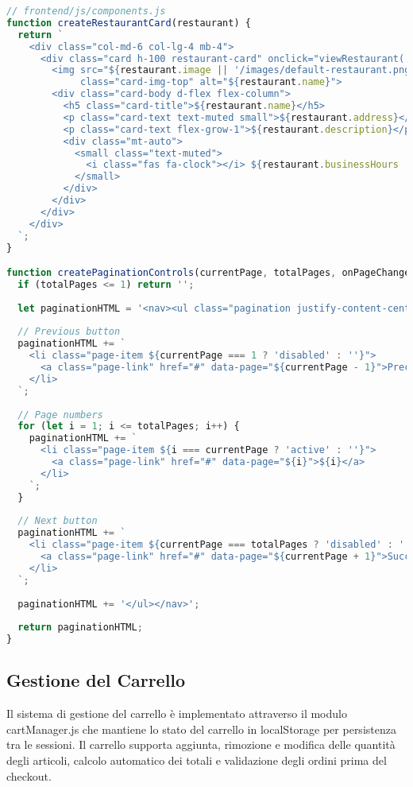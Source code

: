 \documentclass[12pt,a4paper]{article}
\begin{document}
\begin{lstlisting}[language=JavaScript, caption=Componenti UI riutilizzabili]
// frontend/js/components.js
function createRestaurantCard(restaurant) {
  return `
    <div class="col-md-6 col-lg-4 mb-4">
      <div class="card h-100 restaurant-card" onclick="viewRestaurant('${restaurant._id}')">
        <img src="${restaurant.image || '/images/default-restaurant.png'}" 
             class="card-img-top" alt="${restaurant.name}">
        <div class="card-body d-flex flex-column">
          <h5 class="card-title">${restaurant.name}</h5>
          <p class="card-text text-muted small">${restaurant.address}</p>
          <p class="card-text flex-grow-1">${restaurant.description}</p>
          <div class="mt-auto">
            <small class="text-muted">
              <i class="fas fa-clock"></i> ${restaurant.businessHours || 'Orari da definire'}
            </small>
          </div>
        </div>
      </div>
    </div>
  `;
}

function createPaginationControls(currentPage, totalPages, onPageChange) {
  if (totalPages <= 1) return '';
  
  let paginationHTML = '<nav><ul class="pagination justify-content-center">';
  
  // Previous button
  paginationHTML += `
    <li class="page-item ${currentPage === 1 ? 'disabled' : ''}">
      <a class="page-link" href="#" data-page="${currentPage - 1}">Precedente</a>
    </li>
  `;
  
  // Page numbers
  for (let i = 1; i <= totalPages; i++) {
    paginationHTML += `
      <li class="page-item ${i === currentPage ? 'active' : ''}">
        <a class="page-link" href="#" data-page="${i}">${i}</a>
      </li>
    `;
  }
  
  // Next button
  paginationHTML += `
    <li class="page-item ${currentPage === totalPages ? 'disabled' : ''}">
      <a class="page-link" href="#" data-page="${currentPage + 1}">Successivo</a>
    </li>
  `;
  
  paginationHTML += '</ul></nav>';
  
  return paginationHTML;
}
\end{lstlisting}

\subsection{Gestione del Carrello}

Il sistema di gestione del carrello è implementato attraverso il modulo cartManager.js che mantiene lo stato del carrello in localStorage per persistenza tra le sessioni. Il carrello supporta aggiunta, rimozione e modifica delle quantità degli articoli, calcolo automatico dei totali e validazione degli ordini prima del checkout.
\end{document}
